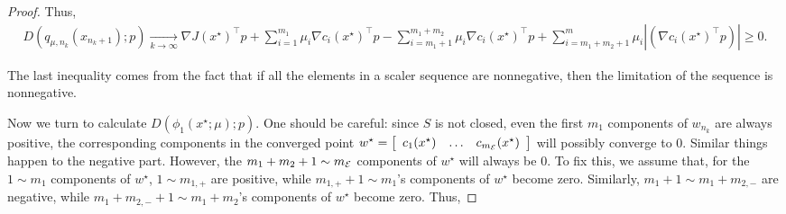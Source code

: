 \begin{proof}
    Thus,
    \begin{align}
        D(q_{\mu,n_k}(x_{n_{k}+1});p) \xrightarrow[k \to \infty]{}
        \nabla J(x^\star)^\top p + \sum_{i=1}^{m_1} \mu_i\nabla c_i(x^\star)^\top p - \sum_{i=m_1+1}^{m_1+m_2} \mu_i\nabla c_i(x^\star)^\top p +
         \sum_{i=m_1+m_2+1}^{m} \mu_i|(\nabla c_i(x^\star)^\top p)| \geq 0.
    \end{align}

    The last inequality comes from the fact that if all the elements in a scaler sequence are nonnegative, then the limitation of the sequence is nonnegative.
    
    Now we turn to calculate $D(\phi_1(x^\star;\mu);p)$. One should be careful: since $S$ is not closed, even the first $m_1$ components of $w_{n_k}$ are always positive, the corresponding components in the converged point $w^\star = \bmat{ccc}c_1(x^\star)&\dots&c_{m_\calE}(x^\star)\emat $ will possibly converge to 0. Similar things happen to the negative part. However, the $m_1 + m_2 + 1 \sim m_\calE$ components of $w^\star$ will always be 0. To fix this, we assume that, for the $1 \sim m_1$ components of $w^\star$, $1 \sim m_{1,+}$ are positive, while $m_{1,+} + 1 \sim m_1$'s components of $w^\star$ become zero. Similarly, $m_1 + 1 \sim m_1 + m_{2,-}$ are negative, while $m_1 + m_{2,-} + 1 \sim m_1 + m_2$'s components of $w^\star$ become zero. Thus,
    

\end{proof}
